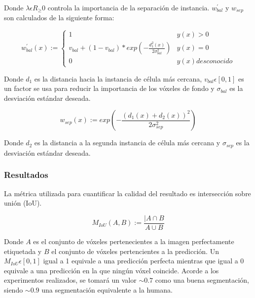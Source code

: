 Donde $\lambda \epsilon R_{\geq}0$ controla la importancia de la separación de instancia. $w^{'}_{bal}$ y $w_{sep}$
son calculados de la siguiente forma:

\begin{equation}
w^{'}_{bal}(x):= \left \{ \begin{matrix} 1 & y(x)>0
\\ v_{bal}+(1-v_{bal})*exp(-\frac{d^2_1(x)}{2\sigma^2_{bal}}) & y(x)=0
\\ 0 & y(x) desconocido \end{matrix}\right. 
\end{equation}

Donde $d_1$ es la distancia hacia la instancia de célula más cercana, $v_{bal}\epsilon [0,1]$ es un factor se usa para reducir la importancia de los vóxeles de fondo y $\sigma_{bal}$ es la desviación estándar deseada.

\begin{equation}
w_{sep}(x) := exp(-\frac{(d_1(x)+d_2(x))^2}{2\sigma_{sep}^2})
\end{equation}

Donde $d_2$ es la distancia a la segunda instancia de célula más cercana y $\sigma_{sep}$ es la desviación estándar deseada. 


\subsubsection{Resultados}


La métrica utilizada para cuantificar la calidad del resultado es intersección sobre unión (IoU).

\begin{equation}
M_{IoU}(A, B) := \frac{|A\cap B}{A\cup B}
\end{equation}

Donde $A$ es el conjunto de vóxeles pertenecientes a la imagen perfectamente etiquetada y $B$ el conjunto de vóxeles pertencientes a la predicción. Un $M_{IoU}\epsilon[0,1]$ igual a 1 equivale a una predicción perfecta mientras que igual a 0 equivale a una predicción en la que ningún vóxel coincide.
Acorde a los experimentos realizados, se tomará un valor $\sim0.7$ como una buena segmentación, siendo $\sim0.9$ una segmentación equivalente a la humana.

